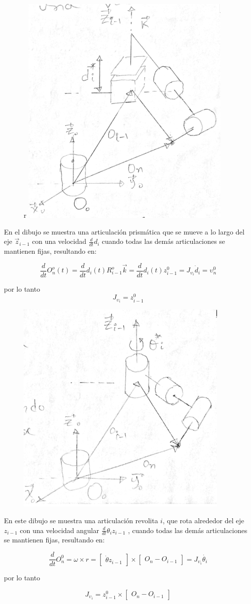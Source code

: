 \documentclass[10pt,a4paper]{article}
\begin{document}
\begin{figure}{r}
     \centering
    \includegraphics[width=0.3\linewidth]{f2}
\end{figure}
En el dibujo se muestra una articulación prismática que se mueve a lo largo del eje $\vec{z}_{i-1}$ con una velocidad $\frac{d}{dt}d_i$ cuando todas las demás articulaciones se mantienen fijas, resultando en:

$$
\frac{d}{dt} O_n^o(t) = \frac{d}{dt} d_i(t) R_{i-1}^o \vec{k} = \frac{d}{dt}d_i(t) z_{i-1}^0 = J_{\upsilon_i} \dot{d}_i = \upsilon_n^0
$$

por lo tanto $$J_{\upsilon_i}=z_{i-1}^0$$

\begin{figure}[h]
     \centering
    \includegraphics[width=0.3\linewidth]{f3}
\end{figure}
En este dibujo se muestra una articulación revolita $i$, que rota alrededor del eje $z_{i-1}$ con una velocidad angular $\frac{d}{dt}\theta_i z_{i-1}$ , cuando todas las demás articulaciones se mantienen fijas, resultando en:

$$
\frac{d}{dt}O_n^0 = \omega \times r = \begin{bmatrix}
	\dot{\theta}z_{i-1}
\end{bmatrix} \times \begin{bmatrix}
	O_n-O_{i-1}
\end{bmatrix} = J_{\upsilon_i} \dot{\theta_i}
$$

por lo tanto

$$ J_{\upsilon_i} = z_{i-1}^0 \times \begin{bmatrix}
	O_n-O_{i-1}
\end{bmatrix} $$
\end{document}
